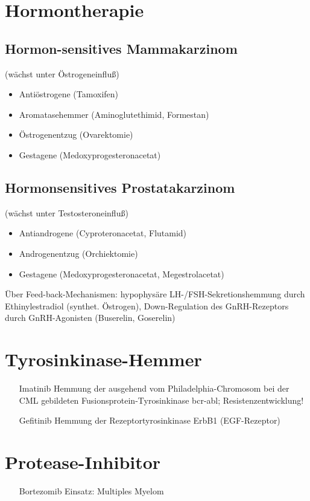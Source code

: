 \documentclass[10pt,a4paper]{report}
\begin{document}
\section{Hormontherapie} %
\label{sec:hormontherapie}
\subsection{Hormon-sensitives Mammakarzinom } %
\label{sub:hormon_sensitives_mammakarzinom_}
(wächst unter Östrogeneinfluß)
\begin{itemize}
	\item Antiöstrogene (Tamoxifen)
	\item Aromatasehemmer (Aminoglutethimid, Formestan)
	\item Östrogenentzug (Ovarektomie)
	\item Gestagene (Medoxyprogesteronacetat)
\end{itemize}
\subsection{Hormonsensitives Prostatakarzinom} %
\label{sub:hormonsensitives_prostatakarzinom}
(wächst unter Testosteroneinfluß)
\begin{itemize}
	\item Antiandrogene (Cyproteronacetat, Flutamid)
	\item Androgenentzug (Orchiektomie)
	\item Gestagene (Medoxyprogesteronacetat, Megestrolacetat)
\end{itemize}
Über Feed-back-Mechanismen: hypophysäre LH-/FSH-Sekretionshemmung durch Ethinylestradiol (synthet. Östrogen), Down-Regulation des GnRH-Rezeptors durch GnRH-Agonisten (Buserelin, Goserelin)
\section{Tyrosinkinase-Hemmer} %
\label{sec:tyrosinkinase_hemmer}
\begin{itemize}
	\item[Imatinib] Hemmung der ausgehend vom Philadelphia-Chromosom bei der CML gebildeten Fusionsprotein-Tyrosinkinase bcr-abl; Resistenzentwicklung! 
	\item[Gefitinib] Hemmung der Rezeptortyrosinkinase ErbB1 (EGF-Rezeptor)
\end{itemize}
\section{Protease-Inhibitor} %
\label{sec:protease_inhibitor}
\begin{itemize}
	\item[Bortezomib] Einsatz: Multiples Myelom
\end{itemize}
\end{document}

